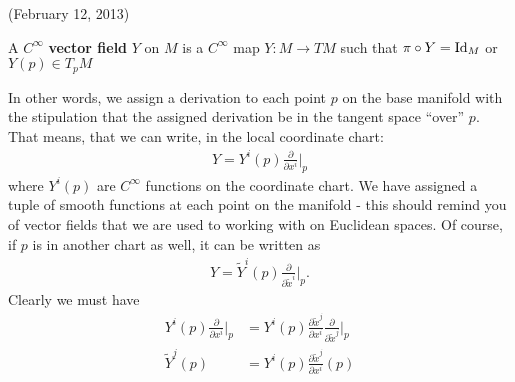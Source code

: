 \documentclass{../mathnotes}
\begin{document}
(February 12, 2013)

\begin{defn}
    A $C^\infty$ \textbf{vector field} $Y$ on $M$ is a $C^\infty$ map $Y:M\to TM$ such that $\pi\circ Y=\operatorname{Id}_M$ or $Y(p)\in T_pM$
\end{defn}

In other words, we assign a derivation to each point $p$ on the base manifold with the stipulation that the assigned derivation be in the
tangent space ``over'' $p$. That means, that we can write, in the local coordinate chart:
\begin{align*}
    Y=Y^i(p)\frac{\partial}{\partial x^i}\bigg|_p
\end{align*}
where $Y^i(p)$ are $C^\infty$ functions on the coordinate chart. We have assigned a tuple of smooth functions at each point on the manifold - this
should remind you of vector fields that we are used to working with on Euclidean spaces. Of course, if $p$ is in another chart as well, it can be
written as 
\begin{align*}
    Y=\tilde{Y}^i(p)\frac{\partial}{\partial \tilde{x}^i}\bigg|_p.
\end{align*}
Clearly we must have
\begin{align*}
    Y^i(p)\frac{\partial}{\partial x^i}\bigg|_p&=Y^i(p)\frac{\partial \tilde{x}^j}{\partial x^i}\frac{\partial}{\partial \tilde{x}^j}\bigg|_p\\
    \tilde{Y}^j(p)&=Y^i(p)\frac{\partial \tilde{x}^j}{\partial x^i}(p)
\end{align*}
\end{document}
